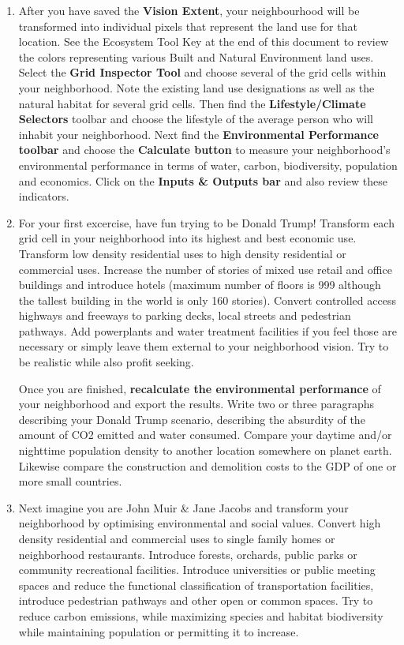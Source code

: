 \documentclass{article}
\begin{document}
\begin{enumerate}[leftmargin=15mm]
\item After you have saved the \textbf{Vision Extent}, your neighbourhood will be transformed into individual pixels that represent the land use for that location.  See the Ecosystem Tool Key at the end of this document to review the colors representing various Built and Natural Environment land uses.  Select the \textbf{Grid Inspector Tool} and choose several of the grid cells within your neighborhood.  Note the existing land use designations as well as the natural habitat for several grid cells.  Then find the \textbf{Lifestyle/Climate Selectors} toolbar and choose the lifestyle of the average person who will inhabit your neighborhood.  Next find the \textbf{Environmental Performance toolbar} and choose the \textbf{Calculate button} to measure your neighborhood's environmental performance in terms of water, carbon, biodiversity, population and economics.  Click on the \textbf{Inputs \& Outputs bar} and also review these indicators.

\item For your first excercise, have fun trying to be Donald Trump! Transform each grid cell in your neighborhood into its highest and best economic use.  Transform low density residential uses to high density residential or commercial uses.  Increase the number of stories of mixed use retail and office buildings and introduce hotels (maximum number of floors is 999 although the tallest building in the world is only 160 stories).  Convert controlled access highways and freeways to parking decks, local streets and pedestrian pathways.  Add powerplants and water treatment facilities if you feel those are necessary or simply leave them external to your neighborhood vision.  Try to be realistic while also profit seeking.

Once you are finished, \textbf{recalculate the environmental performance} of your neighborhood and export the results.  Write two or three paragraphs describing your Donald Trump scenario, describing the absurdity of the amount of CO2 emitted and water consumed.  Compare your daytime and/or nighttime population density to another location somewhere on planet earth.  Likewise compare the construction and demolition costs to the GDP of one or more small countries.

\item Next imagine you are John Muir \& Jane Jacobs and transform your neighborhood by optimising environmental and social values.  Convert high density residential and commercial uses to single family homes or neighborhood restaurants.  Introduce forests, orchards, public parks or community recreational facilities.  Introduce universities or public meeting spaces and reduce the functional classification of transportation facilities, introduce pedestrian pathways and other open or common spaces.  Try to reduce carbon emissions, while maximizing species and habitat biodiversity while maintaining population or permitting it to increase.  


\end{enumerate}
\end{document}
